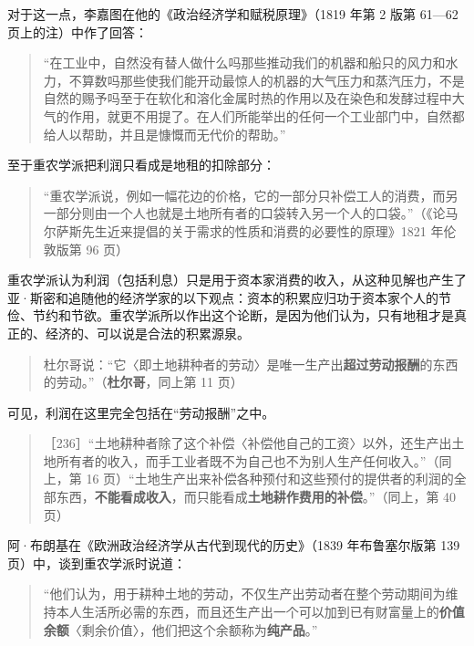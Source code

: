 对于这一点，李嘉图在他的《政治经济学和赋税原理》（1819 年第 2 版第 61—62 页上的注）中作了回答：

\begin{quote}“在工业中，自然没有替人做什么吗那些推动我们的机器和船只的风力和水力，不算数吗那些使我们能开动最惊人的机器的大气压力和蒸汽压力，不是自然的赐予吗至于在软化和溶化金属时热的作用以及在染色和发酵过程中大气的作用，就更不用提了。在人们所能举出的任何一个工业部门中，自然都给人以帮助，并且是慷慨而无代价的帮助。”\end{quote}

至于重农学派把利润只看成是地租的扣除部分：

\begin{quote}“重农学派说，例如一幅花边的价格，它的一部分只补偿工人的消费，而另一部分则由一个人\fontbox{~\{}也就是土地所有者\fontbox{\}~}的口袋转入另一个人的口袋。”（《论马尔萨斯先生近来提倡的关于需求的性质和消费的必要性的原理》1821 年伦敦版第 96 页）\end{quote}

重农学派认为利润（包括利息）只是用于资本家消费的收入，从这种见解也产生了亚·斯密和追随他的经济学家的以下观点：资本的积累应归功于资本家个人的节俭、节约和节欲。重农学派所以作出这个论断，是因为他们认为，只有地租才是真正的、经济的、可以说是合法的积累源泉。

\begin{quote}杜尔哥说：“它〈即土地耕种者的劳动〉是唯一生产出\textbf{超过劳动报酬}的东西的劳动。”（\textbf{杜尔哥}，同上第 11 页）\end{quote}

可见，利润在这里完全包括在“劳动报酬”之中。

\begin{quote}［236］“土地耕种者除了这个补偿〈补偿他自己的工资〉以外，还生产出土地所有者的收入，而手工业者既不为自己也不为别人生产任何收入。”（同上，第 16 页）“土地生产出来补偿各种预付和这些预付的提供者的利润的全部东西，\textbf{不能看成收入}，而只能看成\textbf{土地耕作费用的补偿}。”（同上，第 40 页）\end{quote}

阿·布朗基在《欧洲政治经济学从古代到现代的历史》（1839 年布鲁塞尔版第 139 页）中，谈到重农学派时说道：

\begin{quote}“他们认为，用于耕种土地的劳动，不仅生产出劳动者在整个劳动期间为维持本人生活所必需的东西，而且还生产出一个可以加到已有财富量上的\textbf{价值余额}〈剩余价值〉，他们把这个余额称为\textbf{纯产品}。”\end{quote}

